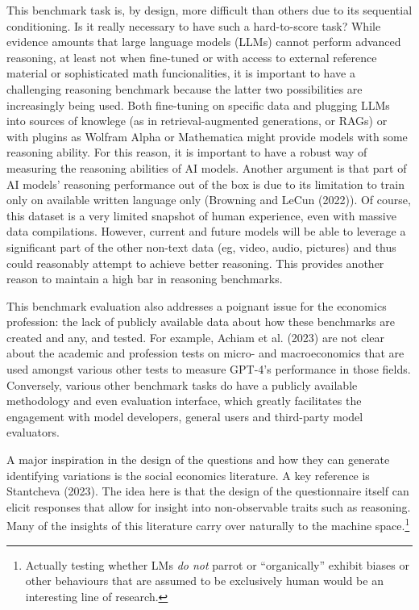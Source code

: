 \documentclass[
]{article}
\theoremstyle{plain}
\theoremstyle{definition}
\theoremstyle{remark}
\begin{document}
This benchmark task is, by design, more difficult than others due to its
sequential conditioning. Is it really necessary to have such a
hard-to-score task? While evidence amounts that large language models
(LLMs) cannot perform advanced reasoning, at least not when fine-tuned
or with access to external reference material or sophisticated math
funcionalities, it is important to have a challenging reasoning
benchmark because the latter two possibilities are increasingly being
used. Both fine-tuning on specific data and plugging LLMs into sources
of knowlege (as in retrieval-augmented generations, or RAGs) or with
plugins as Wolfram Alpha or Mathematica might provide models with some
reasoning ability. For this reason, it is important to have a robust way
of measuring the reasoning abilities of AI models. Another argument is
that part of AI models' reasoning performance out of the box is due to
its limitation to train only on available written language only
(Browning and LeCun (2022)). Of course, this dataset is a very limited
snapshot of human experience, even with massive data compilations.
However, current and future models will be able to leverage a
significant part of the other non-text data (eg, video, audio, pictures)
and thus could reasonably attempt to achieve better reasoning. This
provides another reason to maintain a high bar in reasoning benchmarks.

This benchmark evaluation also addresses a poignant issue for the
economics profession: the lack of publicly available data about how
these benchmarks are created and any, and tested. For example, Achiam et
al. (2023) are not clear about the academic and profession tests on
micro- and macroeconomics that are used amongst various other tests to
measure GPT-4's performance in those fields. Conversely, various other
benchmark tasks do have a publicly available methodology and even
evaluation interface, which greatly facilitates the engagement with
model developers, general users and third-party model evaluators.

A major inspiration in the design of the questions and how they can
generate identifying variations is the social economics literature. A
key reference is Stantcheva (2023). The idea here is that the design of
the questionnaire itself can elicit responses that allow for insight
into non-observable traits such as reasoning. Many of the insights of
this literature carry over naturally to the machine space.\footnote{Actually
  testing whether LMs \emph{do not} parrot or ``organically'' exhibit
  biases or other behaviours that are assumed to be exclusively human
  would be an interesting line of research.}
\end{document}
